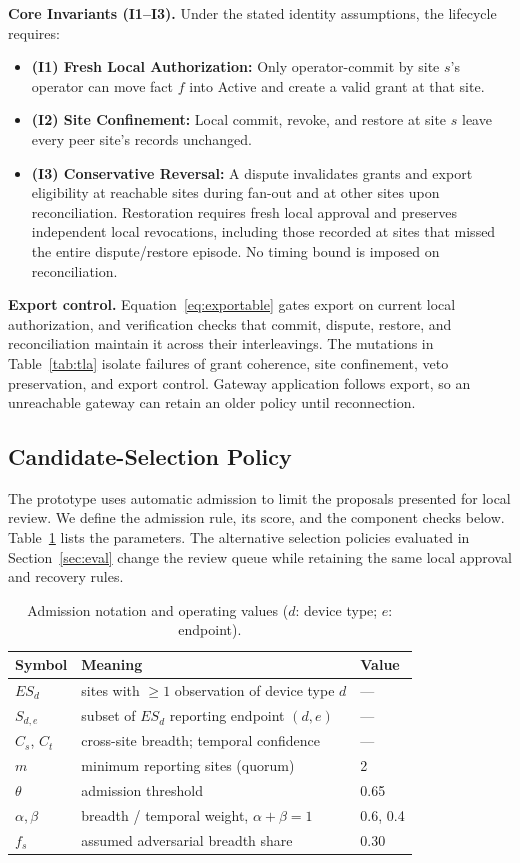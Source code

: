 \documentclass[journal]{IEEEtran}
\theoremstyle{definition}
\begin{document}
\textbf{Core Invariants (I1--I3).} Under the stated identity assumptions, the lifecycle requires:
\begin{itemize}
\item \textbf{(I1) Fresh Local Authorization:} Only operator-commit by site $s$'s operator can move fact $f$ into Active and create a valid grant at that site.
\item \textbf{(I2) Site Confinement:} Local commit, revoke, and restore at site $s$ leave every peer site's records unchanged.
\item \textbf{(I3) Conservative Reversal:} A dispute invalidates grants and export eligibility at reachable sites during fan-out and at other sites upon reconciliation. Restoration requires fresh local approval and preserves independent local revocations, including those recorded at sites that missed the entire dispute/restore episode. No timing bound is imposed on reconciliation.
\end{itemize}

\textbf{Export control.} Equation~\ref{eq:exportable} gates export on current local authorization, and verification checks that commit, dispute, restore, and reconciliation maintain it across their interleavings. The mutations in Table~\ref{tab:tla} isolate failures of grant coherence, site confinement, veto preservation, and export control. Gateway application follows export, so an unreachable gateway can retain an older policy until reconnection.

\subsection{Candidate-Selection Policy}
\label{sec:scoring}
The prototype uses automatic admission to limit the proposals presented for local review. We define the admission rule, its score, and the component checks below. Table~\ref{tab:symbols} lists the parameters. The alternative selection policies evaluated in Section~\ref{sec:eval} change the review queue while retaining the same local approval and recovery rules.

\begin{table}[t]
\centering
\caption{Admission notation and operating values ($d$: device type; $e$: endpoint).}
\label{tab:symbols}
\scriptsize
\begin{tabular}{@{}p{1.3cm}p{5.00cm}p{0.75cm}@{}}
\toprule
Symbol & Meaning & Value \\
\midrule
$ES_d$ & sites with $\ge1$ observation of device type $d$ & --- \\
$S_{d,e}$ & subset of $ES_d$ reporting endpoint $(d,e)$ & --- \\
$C_s$, $C_t$ & cross-site breadth; temporal confidence & --- \\
$m$ & minimum reporting sites (quorum) & 2 \\
$\theta$ & admission threshold & 0.65 \\
$\alpha,\beta$ & breadth / temporal weight, $\alpha+\beta=1$ & 0.6, 0.4 \\
$f_s$ & assumed adversarial breadth share & 0.30 \\
\bottomrule
\end{tabular}
\end{table}
\end{document}
